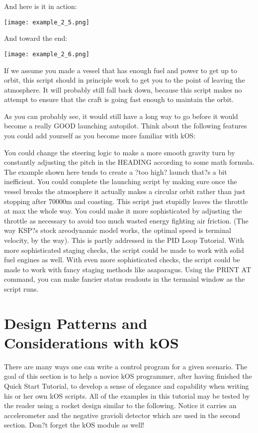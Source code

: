And here is it in action:

\begin{center}
\texttt{[image: example\_2\_5.png]}
\end{center}

And toward the end:

\begin{center}
\texttt{[image: example\_2\_6.png]}
\end{center}

If we assume you made a vessel that has enough fuel and power to get up to orbit, this script should in principle work to get you to the point of leaving the atmosphere. It will probably still fall back down, because this script makes no attempt to ensure that the craft is going fast enough to maintain the orbit.

As you can probably see, it would still have a long way to go before it would become a really GOOD launching autopilot. Think about the following features you could add yourself as you become more familiar with kOS:

You could change the steering logic to make a more smooth gravity turn by constantly adjusting the pitch in the HEADING according to some math formula. The example shown here tends to create a ?too high? launch that?s a bit inefficient.
You could complete the launching script by making sure once the vessel breaks the atmosphere it actually makes a circular orbit rather than just stopping after 70000m and coasting.
This script just stupidly leaves the throttle at max the whole way. You could make it more sophisticated by adjusting the throttle as necessary to avoid too much wasted energy fighting air friction. (The way KSP?s stock areodynamic model works, the optimal speed is terminal velocity, by the way). This is partly addressed in the PID Loop Tutorial.
With more sophisticated staging checks, the script could be made to work with solid fuel engines as well.
With even more sophisticated checks, the script could be made to work with fancy staging methods like asaparagus.
Using the PRINT AT command, you can make fancier status readouts in the termainl window as the script runs.
	\section{Design Patterns and Considerations with kOS} %
	
There are many ways one can write a control program for a given scenario. The goal of this section is to help a novice kOS programmer, after having finished the Quick Start Tutorial, to develop a sense of elegance and capability when writing his or her own kOS scripts. All of the examples in this tutorial may be tested by the reader using a rocket design similar to the following. Notice it carries an accelerometer and the negative gravioli detector which are used in the second section. Don?t forget the kOS module as well!

